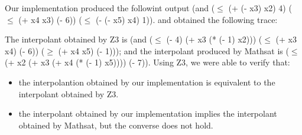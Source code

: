 Our implementation produced the followint output
(and
($\leq$ (+ (- x3) x2) 4)
($\leq$ (+ x4 x3) (- 6))
($\leq$ (- (- x5) x4) 1)).
and obtained the following trace:



The interpolant obtained by Z3 is 
(and ($\leq$ (- 4) (+ x3 (* (- 1) x2))) ($\leq$ (+ x3 x4) (- 6)) ($\geq$ (+ x4 x5) (- 1))); 
and the interpolant produced by Mathsat is ($\leq$ (+ x2 (+ x3 (+ x4 (* (- 1) x5)))) (- 7)).
Using Z3, we were able to verify that: 
\begin{itemize}
  \item the interpolantion obtained by our implementation
    is equivalent to the interpolant obtained by Z3. 
  \item the interpolant obtained by our implementation implies the interpolant
    obtained by Mathsat, but the converse does not hold.
\end{itemize}





